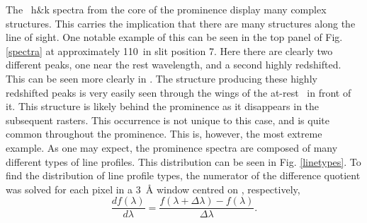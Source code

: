 The \mgii~h\&k spectra from the core of the prominence display many complex structures. This carries the implication that there are many structures along the line of sight. One notable example of this can be seen in the top panel of Fig. \ref{spectra} at approximately 110\arcsec\ in slit position 7. Here there are clearly two different peaks, one near the rest wavelength, and a second highly redshifted. This can be seen more clearly in . The structure producing these highly redshifted peaks is very easily seen through the wings of the at-rest \mgii\ in front of it. This structure is likely behind the prominence as it disappears in the subsequent rasters. This occurrence is not unique to this case, and is quite common throughout the prominence. This is, however, the most extreme example. As one may expect, the prominence  spectra are composed of many different types of line profiles. This distribution can be seen in Fig. \ref{linetypes}. To find the distribution of line profile types, the numerator of the difference quotient was solved for each pixel in a 3~\AA{} window centred on \mgiihk{}, respectively,
\begin{equation}
    \frac{df(\lambda)}{d\lambda}=\frac{f(\lambda+\Delta\lambda)-f(\lambda)}{\Delta\lambda}.
\end{equation}

